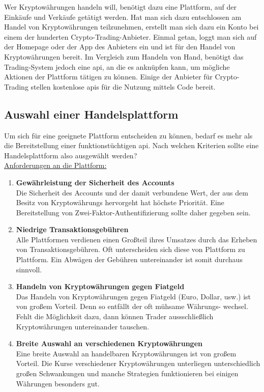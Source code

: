 \documentclass[oneside]{ausarbeitung}
\begin{document}
Wer Kryptowährungen handeln will, benötigt dazu eine Plattform, auf
der Einkäufe und Verkäufe getätigt werden. Hat man sich dazu
entschlossen am Handel von Kryptowährungen teilzunehmen, erstellt man
sich dazu ein Konto bei einem der hunderten Crypto-Trading-Anbieter.
Einmal getan, loggt man sich auf der Homepage oder der App des
Anbieters ein und ist für den Handel von Kryptowährungen bereit. Im
Vergleich zum Handeln von Hand, benötigt das Trading-System jedoch
eine \ac{api}, an die es anknüpfen kann, um mögliche Aktionen der
Plattform tätigen zu können. Einige der Anbieter für Crypto-Trading
stellen kostenlose \ac{api}s für die Nutzung mittels Code bereit.

\subsection{Auswahl einer Handelsplattform}
\label{sub:auswahl_plattform}

Um sich für eine geeignete Plattform entscheiden zu können, bedarf
es mehr als die Bereitstellung einer funktionstüchtigen \ac{api}.
Nach welchen Kriterien sollte eine Handelsplattform also ausgewählt
werden? \\

\underline{Anforderungen an die Plattform:}
\begin{enumerate}
	\item \textbf{Gewährleistung der Sicherheit des Accounts} \\
		Die Sicherheit des Accounts und der damit 
		verbundene Wert, der aus dem Besitz von Kryptowährungs hervorgeht hat
		höchste Priorität. Eine Bereitstellung von Zwei-Faktor-Authentifizierung
		sollte daher gegeben sein.
	\item \textbf{Niedrige Transaktionsgebühren} \\
		Alle Plattformen verdienen einen Großteil ihres Umsatzes durch das
		Erheben von Transaktionsgebühren. Oft unterscheiden sich diese von
		Plattform zu Plattform. Ein Abwägen der Gebühren untereinander ist
		somit durchaus sinnvoll.
	\item \textbf{Handeln von Kryptowährungen gegen Fiatgeld} \\
		Das Handeln von Kryptowährungen gegen Fiatgeld (Euro, Dollar, usw.)
		ist von großem Vorteil. Denn so entfällt der oft mühsame Währungs-
		wechsel. Fehlt die Möglichkeit dazu, dann können Trader aussschließlich
		Kryptowährungen untereinander tauschen.
	\item \textbf{Breite Auswahl an verschiedenen Kryptowährungen} \\
		Eine breite Auswahl an handelbaren Kryptowährungen ist von großem
		Vorteil. Die Kurse verschiedener Kryptowährungen unterliegen
		unterschiedlich großen Schwankungen und manche Strategien funktionieren
		bei einigen Währungen besonders gut. \\
\end{enumerate}
\end{document}
